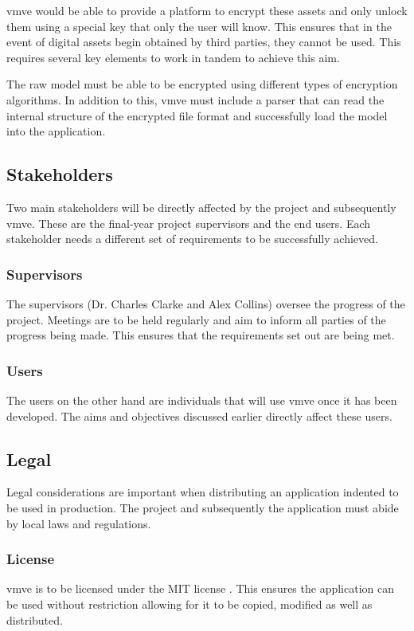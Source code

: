 \documentclass[11pt]{article}
\begin{document}
\gls{vmve} would be able to provide a platform to encrypt these assets and only
unlock them using a special key that only the user will know. This ensures that
in the event of digital assets begin obtained by third parties, they cannot be
used. This requires several key elements to work in tandem to achieve this aim.

The raw model must be able to be encrypted using different types of encryption
algorithms. In addition to this, \gls{vmve} must include a parser that can read
the internal structure of the encrypted file format and successfully load the
model into the application.

\subsection{Stakeholders}
Two main stakeholders will be directly affected by the project and subsequently
\gls{vmve}. These are the final-year project supervisors and the end users. Each
stakeholder needs a different set of requirements to be successfully achieved.

\subsubsection{Supervisors}
The supervisors (Dr. Charles Clarke and Alex Collins) oversee the progress of
the project. Meetings are to be held regularly and aim to inform all parties of
the progress being made. This ensures that the requirements set out are being
met.

\subsubsection{Users}
The users on the other hand are individuals that will use \gls{vmve} once it has
been developed. The aims and objectives discussed earlier directly affect these
users.

\subsection{Legal}
Legal considerations are important when distributing an application indented to
be used in production. The project and subsequently the application must abide by
local laws and regulations.

\subsubsection{License}
\gls{vmve} is to be licensed under the MIT license \cite{mit}. This ensures the
application can be used without restriction allowing for it to be copied,
modified as well as distributed.
\end{document}

